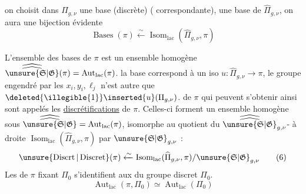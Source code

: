 


 on choisit dans $\Pi_{g,\nu}$ une base (discrète) ( correspondante),  une base de $\widehat{\Pi}_{g,\nu}$, on aura une bijection évidente
\[
\operatorname{Bases}(\pi) \xleftarrow{\sim} \operatorname{Isom}_{\mathrm{lac}}(\widehat{\Pi}_{g,\nu},\pi)
\tag{5}
\]

L'ensemble des bases de $\pi$ est un ensemble homogène   $\widehat{\widehat{\unsure{\mathfrak S|\mathfrak G}}}(\pi)=\operatorname{Aut}_{\mathrm{lac}}(\pi)$.  la  base correspond à un iso $u:\widehat{\Pi}_{g,\nu}\longrightarrow\pi$, le groupe  engendré par les $x_i,y_i,\ell_j$ n'est autre que $\deleted{\illegible{1}}\inserted{u}(\Pi_{g,\nu})$.   de $\pi$ qui peuvent s'obtenir ainsi sont appelés les \uline{discrétifications} de $\pi$. Celles-ci forment un ensemble homogène sous $\widehat{\widehat{\unsure{\mathfrak S|\mathfrak G}}}=\operatorname{Aut}_{\mathrm{lac}}(\pi)$,  isomorphe au quotient du $\widehat{\widehat{\unsure{\mathfrak S|\mathfrak G}}}_{g,\nu}$- à droite $\operatorname{Isom}_{\mathrm{lac}}(\widehat{\Pi}_{g,\nu},\pi)$ par $\unsure{\mathfrak S|\mathfrak G}_{g,\nu}$ :
\[
\unsure{\operatorname{Discrt}|\operatorname{Discret}}(\pi) \xleftarrow{\sim} \operatorname{Isom}_{\mathrm{lac}}(\widehat{\Pi}_{g,\nu},\pi)/\unsure{\mathfrak S|\mathfrak G}_{g,\nu}
\tag{6}
\]
Les   de $\pi$ fixant  $\Pi_0$ s'identifient aux  du groupe discret  $\Pi_0$.
\[
\operatorname{Aut}_{\mathrm{lac}}(\pi,\Pi_0)\simeq\operatorname{Aut}_{\mathrm{lac}}(\Pi_0)
\tag{7}
\]



